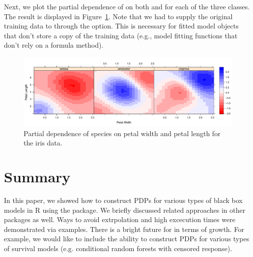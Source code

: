 Next, we plot the partial dependence of  on both  and  for each of the three classes. The result is displayed in Figure~\ref{fig:partial_iris}. Note that we had to supply the original training data to  through the  option. This is necessary for fitted model objects that don't store a copy of the training data (e.g., model fitting functions that don't rely on a formula method).

\begin{figure}[htbp]
  \centering
  \includegraphics[width=1.0\linewidth]{partial_iris_svm}
  \caption{Partial dependence of species on petal width and petal length for the iris data.}
  \label{fig:partial_iris}
\end{figure}


\section{Summary}

In this paper, we showed how to construct PDPs for various types of black box models in R using the  package. We briefly discussed related approaches in other packages as well. Ways to avoid extrpolation and high excecution times were demonstrated via examples. There is a bright future for  in terms of growth. For example, we would like to include the ability to construct PDPs for various types of survival models (e.g. conditional random forests with censored response).


